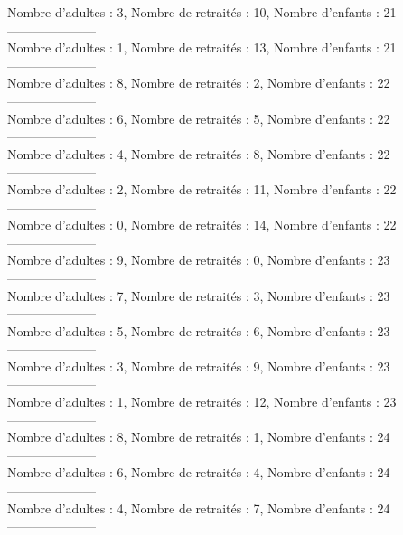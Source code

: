 \documentclass[10pt,a4paper]{article}
\begin{document}
Nombre d'adultes : 3, Nombre de retraités : 10, Nombre d'enfants : 21\\
---------------------\\
Nombre d'adultes : 1, Nombre de retraités : 13, Nombre d'enfants : 21\\
---------------------\\
Nombre d'adultes : 8, Nombre de retraités : 2, Nombre d'enfants : 22\\
---------------------\\
Nombre d'adultes : 6, Nombre de retraités : 5, Nombre d'enfants : 22\\
---------------------\\
Nombre d'adultes : 4, Nombre de retraités : 8, Nombre d'enfants : 22\\
---------------------\\
Nombre d'adultes : 2, Nombre de retraités : 11, Nombre d'enfants : 22\\
---------------------\\
Nombre d'adultes : 0, Nombre de retraités : 14, Nombre d'enfants : 22\\
---------------------\\
Nombre d'adultes : 9, Nombre de retraités : 0, Nombre d'enfants : 23\\
---------------------\\
Nombre d'adultes : 7, Nombre de retraités : 3, Nombre d'enfants : 23\\
---------------------\\
Nombre d'adultes : 5, Nombre de retraités : 6, Nombre d'enfants : 23\\
---------------------\\
Nombre d'adultes : 3, Nombre de retraités : 9, Nombre d'enfants : 23\\
---------------------\\
Nombre d'adultes : 1, Nombre de retraités : 12, Nombre d'enfants : 23\\
---------------------\\
Nombre d'adultes : 8, Nombre de retraités : 1, Nombre d'enfants : 24\\
---------------------\\
Nombre d'adultes : 6, Nombre de retraités : 4, Nombre d'enfants : 24\\
---------------------\\
Nombre d'adultes : 4, Nombre de retraités : 7, Nombre d'enfants : 24\\
---------------------\\
\end{document}
